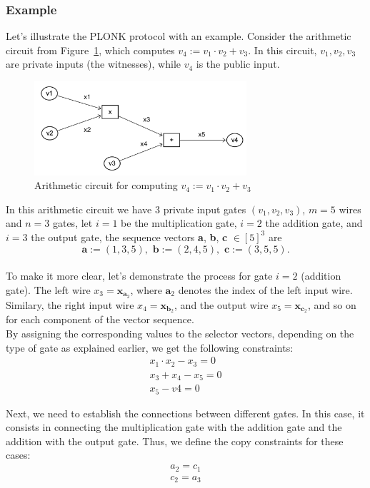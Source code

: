\subsubsection*{Example}
Let's illustrate the PLONK protocol with an example. Consider the arithmetic circuit from Figure~\ref{fig:arithmetic-circuit-plonk}, which computes $v_4:=v_1\cdot v_2+v_3$. In this circuit, $v_1, v_2, v_3$ are private inputs (the witnesses), while $v_4$ is the public input.
\begin{figure}[htbp]
    \centering
    \includegraphics[width=0.7\textwidth]{graphics/arithmetic-circuit-plonk.png}
    \caption{Arithmetic circuit for computing $v_4:=v_1\cdot v_2+v_3$}
    \label{fig:arithmetic-circuit-plonk}
\end{figure}
In this arithmetic circuit we have 3 private input gates $(v_1, v_2, v_3)$, $m=5$ wires and $n=3$ gates, let $i=1$ be the multiplication gate, $i=2$ the addition gate, and $i=3$ the output gate, the sequence vectors \textbf{a}, \textbf{b}, \textbf{c }$\in[5]^3$ are\[\textbf{a}:=(1,3,5),\textbf{ b}:=(2,4,5),\textbf{ c}:=(3,5,5).\]\\
To make it more clear, let's demonstrate the process for gate $i=2$ (addition gate). The left wire $x_3=\textbf{x}_{\textbf{a}_2}$, where $\textbf{a}_2$ denotes the index of the left input wire. Similary, the right input wire $x_4=\textbf{x}_{\textbf{b}_2}$, and the output wire $x_5=\textbf{x}_{\textbf{c}_2}$, and so on for each component of the vector sequence.\\
By assigning the corresponding values to the selector vectors, depending on the type of gate as explained earlier, we get the following constraints:
\begin{align*}
    x_1\cdot x_2-x_3=0 \\
    x_3+x_4-x_5=0 \\
    x_5-v4=0
\end{align*}

Next, we need to establish the connections between different gates. In this case, it consists in connecting the multiplication gate with the addition gate and the addition with the output gate. Thus, we define the copy constraints for these cases:
\begin{align*}
    a_2=c_1 \\
    c_2=a_3
\end{align*}

